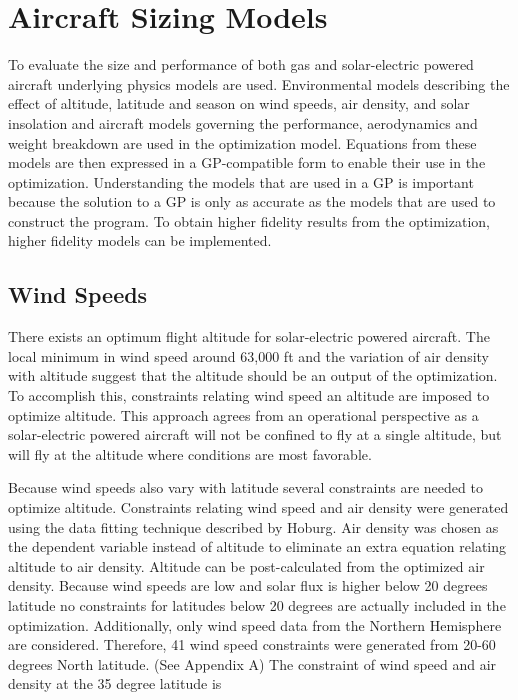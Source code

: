 \documentclass[]{aiaa-tc}%
\begin{document}
\section{Aircraft Sizing Models}

To evaluate the size and performance of both gas and solar-electric powered aircraft underlying physics models are used.  
Environmental models describing the effect of altitude, latitude and season on wind speeds, air density, and solar insolation and aircraft models governing the performance, aerodynamics and weight breakdown are used in the optimization model.
Equations from these models are then expressed in a GP-compatible form to enable their use in the optimization. 
Understanding the models that are used in a GP is important because the solution to a GP is only as accurate as the models that are used to construct the program.  
To obtain higher fidelity results from the optimization, higher fidelity models can be implemented. 

\subsection{Wind Speeds}

There exists an optimum flight altitude for solar-electric powered aircraft.  
The local minimum in wind speed around 63,000 ft and the variation of air density with altitude suggest that the altitude should be an output of the optimization. 
To accomplish this, constraints relating wind speed an altitude are imposed to optimize altitude. 
This approach agrees from an operational perspective as a solar-electric powered aircraft will not be confined to fly at a single altitude, but will fly at the altitude where conditions are most favorable. 

Because wind speeds also vary with latitude several constraints are needed to optimize altitude. 
Constraints relating wind speed and air density were generated using the data fitting technique described by Hoburg\cite{fitting}.
Air density was chosen as the dependent variable instead of altitude to eliminate an extra equation relating altitude to air density. 
Altitude can be post-calculated from the optimized air density. 
Because wind speeds are low and solar flux is higher below 20 degrees latitude no constraints for latitudes below 20 degrees are actually included in the optimization. 
Additionally, only wind speed data from the Northern Hemisphere are considered.
Therefore, 41 wind speed constraints were generated from 20-60 degrees North latitude. (See Appendix A) 
The constraint of wind speed and air density at the 35 degree latitude is 
\end{document}
